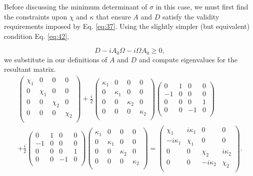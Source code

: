 \documentclass[11pt,a4paper]{article}
\numberwithin{equation}{section}
\begin{document}
	Before discussing the minimum determinant of $\sigma$ in this case, we must first find the constraints upon $\chi$ and $\kappa$ that ensure $A$ and $D$ satisfy the validity requirements imposed by Eq. \ref{eq:37}. Using the slightly simpler (but equivalent) condition Eq. \ref{eq:42}, 
	
	\begin{equation*}
		D - iA_0 \Omega - i\Omega A_0 \geq 0,
	\end{equation*}
	we substitute in our definitions of $A$ and $D$ and compute eigenvalues for the resultant matrix. 
	\begin{multline*}
	\begin{pmatrix}
	\chi_1 & 0 & 0 & 0\\
	0 & \chi_1 & 0 & 0\\
	0 & 0 & \chi_2 & 0 \\
	0 & 0 & 0 & \chi_2\\
	\end{pmatrix} + \frac{i}{2}\begin{pmatrix}
	\kappa_1 & 0 & 0 & 0\\
	0 & \kappa_1 & 0 & 0\\
	0 & 0 & \kappa_2 & 0 \\
	0 & 0 & 0 & \kappa_2\\
	\end{pmatrix}\begin{pmatrix}
	0 & 1 & 0 & 0 \\
	-1 & 0 & 0 & 0\\
	0 & 0 & 0 & 1\\
	0 & 0 & -1 & 0\\
	\end{pmatrix} \\
	+ \frac{i}{2}\begin{pmatrix}
	0 & 1 & 0 & 0 \\
	-1 & 0 & 0 & 0\\
	0 & 0 & 0 & 1\\
	0 & 0 & -1 & 0\\
	\end{pmatrix}\begin{pmatrix}
	\kappa_1 & 0 & 0 & 0\\
	0 & \kappa_1 & 0 & 0\\
	0 & 0 & \kappa_2 & 0 \\
	0 & 0 & 0 & \kappa_2\\
	\end{pmatrix}
	= \begin{pmatrix}
	\chi_1 & i\kappa_1 & 0 & 0 \\
	-i\kappa_1 & \chi_1 & 0 & 0\\
	0 & 0 & \chi_2 & i\kappa_2\\
	0 & 0 & -i\kappa_2 & \chi_2\\
	\end{pmatrix}.
	\end{multline*}
	
\end{document}

